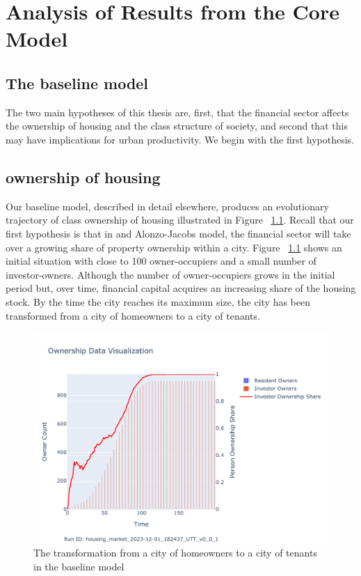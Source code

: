 \chapter{Analysis of Results from the Core Model} \label{chapter-analysis}


\section{The baseline model} 
The two main hypotheses of this thesis are, first,  that the financial sector affects the ownership of housing and the class structure of society, and second that this may have implications for urban productivity. We begin with the first hypothesis.

\section{ownership of housing}

Our baseline model, described in detail elsewhere, produces an evolutionary trajectory of class ownership of housing illustrated in Figure ~\ref{fig:Baseline_ownership_trajectory}. Recall that our first hypothesis is that in and \Gls{Alonzo-Jacobs model}, the financial sector will take over a growing share of property ownership within a city. Figure ~\ref{fig:Baseline_ownership_trajectory} shows an initial situation with close to 100 owner-occupiers and a small number of investor-owners. Although the number of owner-occupiers grows in the initial period but, over time, financial capital acquires an increasing share of the housing stock. By the time the city reaches its maximum size, the city has been transformed from a city of homeowners to a city of tenants.  

\begin{figure}
    \centering
    \includegraphics[scale=.8, trim={0 1cm 0 1.8cm},clip]{fig/Analysis/Ownership_Data_1.pdf}
    \caption{The transformation from a city of homeowners to a city of tenants in the baseline model}
    \label{fig:Baseline_ownership_trajectory}
\end{figure}



